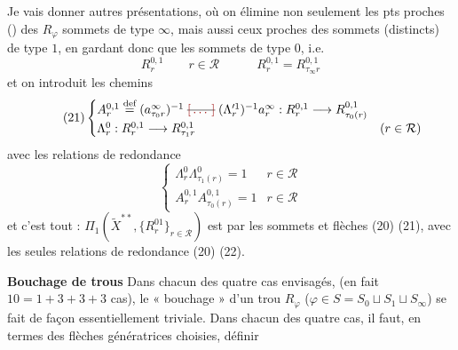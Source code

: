 \documentclass[11pt,a4paper]{article}
\begin{document}

Je vais donner \struck{\ill{}}  autres présentations, où on élimine non seulement les pts proches () des $R_\varphi$ sommets de type $\infty$,  mais aussi ceux proches des sommets (distincts) de type $1$, en gardant donc que les sommets  de type $0$, i.e.
\begin{equation*}
  \tag{20} R^{0,1}_r \qquad r \in \mathcal{R}
  \qquad\quad
  \boxed{R^{0,1}_r = R^{0,1}_{\tau_\infty r}}
\end{equation*}
et on introduit les chemins
\begin{equation*}
  \tag{21}
  \begin{cases}
    A^{0,1}_r \overset{\text{def}}{=} (a^\infty_{\tau_0 r})^{-1} \;\text{\struck{\ill{}}}\; (\Lambda'^1_r)^{-1} a^\infty_r : R^{0,1}_r \longrightarrow R^{0,1}_{\tau_0(r)} \\
    \Lambda^0_r : R^{0,1}_r \longrightarrow R^{0,1}_{\tau_1 r} & (r \in \mathcal{R})
  \end{cases}
\end{equation*}
avec les relations de redondance
\begin{equation*}
  \tag{22}
  \boxed{
  \begin{cases}
    \Lambda^0_r \Lambda^0_{\tau_1(r)} = 1 & r \in \mathcal{R} \\
    A^{0,1}_r A^{0,1}_{\tau_0(r)} = 1 & r \in \mathcal{R}
  \end{cases}}
\end{equation*}
et c'est tout : $\Pi_1(\tilde X^{\ast\ast}, \{R^{01}_r\}_{r \in \mathcal{R}})$ est   par les sommets et flèches (20) (21), avec les seules relations de redondance (20) (22).


\textbf{Bouchage de trous} Dans chacun des quatre cas envisagés, (en fait $10 = 1 + 3 + 3 + 3$ cas), le « bouchage » d'un trou $R_\varphi$ ($\varphi \in S = S_0 \sqcup S_1 \sqcup S_\infty$) se fait de façon essentiellement triviale. Dans chacun des quatre cas, il faut, en termes des \struck{\ill{}} flèches génératrices choisies, définir 
\end{document}
